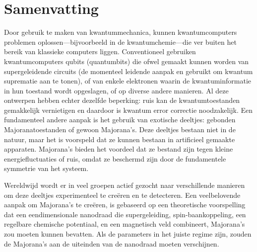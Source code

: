 \chapter*{Samenvatting}
{

Door gebruik te maken van kwantummechanica, kunnen kwantumcomputers problemen oplossen---bijvoorbeeld in de kwantumchemie---die ver buiten het bereik van klassieke computers liggen.
Conventioneel gebruiken kwantumcomputers qubits (quantumbits) die ofwel gemaakt kunnen worden van supergeleidende circuits (de momenteel leidende aanpak en gebruikt om kwantum suprematie aan te tonen), of van enkele elektronen waarin de kwantuminformatie in hun toestand wordt opgeslagen, of op diverse andere manieren.
Al deze ontwerpen hebben echter dezelfde beperking: ruis kan de kwantumtoestanden gemakkelijk vernietigen en daardoor is kwantum error correctie noodzakelijk.
Een fundamenteel andere aanpak is het gebruik van exotische deeltjes: gebonden Majoranatoestanden of gewoon Majorana's.
Deze deeltjes bestaan niet in de natuur, maar het is voorspeld dat ze kunnen bestaan in artificieel gemaakte apparaten.
Majorana's bieden het voordeel dat ze bestand zijn tegen kleine energiefluctuaties of ruis, omdat ze beschermd zijn door de fundamentele symmetrie van het systeem.

Wereldwijd wordt er in veel groepen actief gezocht naar verschillende manieren om deze deeltjes experimenteel te creëren en te detecteren.
Een veelbelovende aanpak om Majorana's te creëren, is gebaseerd op een theoretische voorspelling dat een eendimensionale nanodraad die supergeleiding, spin-baankoppeling, een regelbare chemische potentiaal, en een magnetisch veld combineert, Majorana's zou moeten kunnen bevatten.
Als de parameters in het juiste regime zijn, zouden de Majorana's aan de uiteinden van de nanodraad moeten verschijnen.

}
